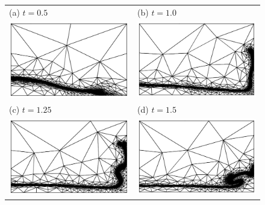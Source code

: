 \begin{figure}[tbp]
\begin{center}
\begin{tabular}{ll}
(a) $t = 0.5$ & (b) $t = 1.0$\\
\includegraphics[width=7cm, clip=true]{examples_images/water_collapse/water_collapse_100_mesh.pdf} & \includegraphics[width=7cm, clip=true]{examples_images/water_collapse/water_collapse_200_mesh.pdf} \\
(c) $t = 1.25$ & (d) $t = 1.5$ \\
\includegraphics[width=7cm, clip=true]{examples_images/water_collapse/water_collapse_250_mesh.pdf} & \includegraphics[width=7cm, clip=true]{examples_images/water_collapse/water_collapse_300_mesh.pdf} \\

\end{tabular}
\end{center}
\end{figure}
